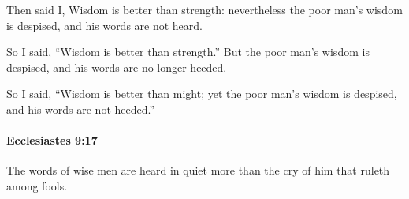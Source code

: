 			\begin{versebox}
					\item[BHS] 
					\item[LXX] 
					\item[ASV] Then said I, Wisdom is better than strength: nevertheless the poor man's wisdom is despised, and his words are not heard.
					\item[NIV] So I said, “Wisdom is better than strength.” But the poor man’s wisdom is despised, and his words are no longer heeded.
					\item[NRSV] So I said, “Wisdom is better than might; yet the poor man’s wisdom is despised, and his words are not heeded.”
			\end{versebox}

		\paragraph{Ecclesiastes 9:17} %
			\label{ECCLESIASTES-9-17}

			The words of wise men are heard in quiet more than the cry of him that ruleth among fools.

